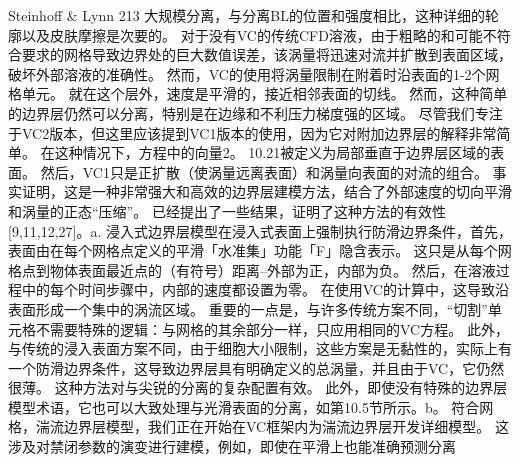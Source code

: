 \documentclass[UTF8,11pt,a4paper,openany,fontset=fandol]{ctexbook}
\begin{document}
Steinhoff \& Lynn 213 大规模分离，与分离BL的位置和强度相比，这种详细的轮廓以及皮肤摩擦是次要的。 对于没有VC的传统CFD溶液，由于粗略的和可能不符合要求的网格导致边界处的巨大数值误差，该涡量将迅速对流并扩散到表面区域，破坏外部溶液的准确性。 然而，VC的使用将涡量限制在附着时沿表面的1-2个网格单元。 就在这个层外，速度是平滑的，接近相邻表面的切线。 然而，这种简单的边界层仍然可以分离，特别是在边缘和不利压力梯度强的区域。 尽管我们专注于VC2版本，但这里应该提到VC1版本的使用，因为它对附加边界层的解释非常简单。 在这种情况下，方程中的向量2。 10.21被定义为局部垂直于边界层区域的表面。 然后，VC1只是正扩散（使涡量远离表面）和涡量向表面的对流的组合。 事实证明，这是一种非常强大和高效的边界层建模方法，结合了外部速度的切向平滑和涡量的正态“压缩”。 已经提出了一些结果，证明了这种方法的有效性[9,11,12,27]。a. 浸入式边界层模型在浸入式表面上强制执行防滑边界条件，首先，表面由在每个网格点定义的平滑「水准集」功能「F」隐含表示。 这只是从每个网格点到物体表面最近点的（有符号）距离--外部为正，内部为负。 然后，在溶液过程中的每个时间步骤中，内部的速度都设置为零。 在使用VC的计算中，这导致沿表面形成一个集中的涡流区域。 重要的一点是，与许多传统方案不同，“切割”单元格不需要特殊的逻辑：与网格的其余部分一样，只应用相同的VC方程。 此外，与传统的浸入表面方案不同，由于细胞大小限制，这些方案是无黏性的，实际上有一个防滑边界条件，这导致边界层具有明确定义的总涡量，并且由于VC，它仍然很薄。 这种方法对与尖锐的分离的复杂配置有效。 此外，即使没有特殊的边界层模型术语，它也可以大致处理与光滑表面的分离，如第10.5节所示。b。 符合网格，湍流边界层模型，我们正在开始在VC框架内为湍流边界层开发详细模型。 这涉及对禁闭参数的演变进行建模，例如，即使在平滑上也能准确预测分离
\end{document}
